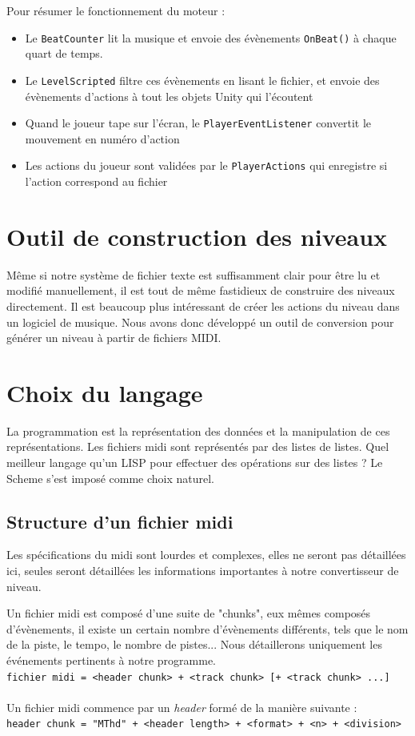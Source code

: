 Pour résumer le fonctionnement du moteur :
\begin{itemize}
\item Le \texttt{BeatCounter} lit la musique et envoie des évènements \texttt{OnBeat()} à chaque quart de temps.
\item Le \texttt{LevelScripted} filtre ces évènements en lisant le fichier, et envoie des évènements d'actions à tout les objets Unity qui l'écoutent
\item Quand le joueur tape sur l'écran, le \texttt{PlayerEventListener} convertit le mouvement en numéro d'action
\item Les actions du joueur sont validées par le \texttt{PlayerActions} qui enregistre si l'action correspond au fichier
\end{itemize}

\section{Outil de construction des niveaux}

Même si notre système de fichier texte est suffisamment clair pour être lu et modifié manuellement, il est tout de même fastidieux de construire des niveaux directement. Il est beaucoup plus intéressant de créer les actions du niveau dans un logiciel de musique. Nous avons donc développé un outil de conversion pour générer un niveau à partir de fichiers MIDI.

\section{Choix du langage}
La programmation est la représentation des données et la manipulation de ces représentations. Les fichiers midi sont représentés par des listes de listes. Quel meilleur langage qu'un LISP pour effectuer des opérations sur des listes ? Le Scheme s'est imposé comme choix naturel.

\subsection{Structure d'un fichier midi}
Les spécifications du midi sont lourdes et complexes, elles ne seront pas détaillées ici, seules seront détaillées les informations importantes à notre convertisseur de niveau.

Un fichier midi est composé d'une suite de "chunks", eux mêmes composés d'évènements, il existe un certain nombre d'évènements différents, tels que le nom de la piste, le tempo, le nombre de pistes... Nous détaillerons uniquement les événements pertinents à notre programme.\\
{\small \texttt{fichier midi = <header chunk> + <track chunk> [+ <track chunk> ...]}}\\\\
Un fichier midi commence par un \textit{header} formé de la manière suivante :\\
{\small \texttt{header chunk = "MThd" + <header length> + <format> + <n> + <division>}}\\

